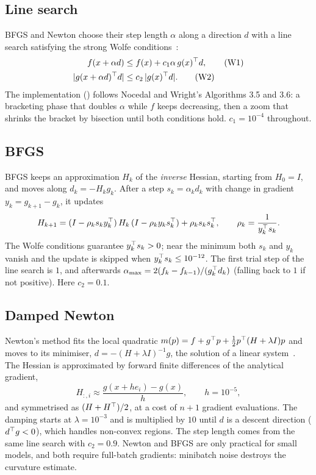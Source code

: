 \subsection{Line search}
BFGS and Newton choose their step length $\alpha$ along a direction $d$ with a line search
satisfying the strong Wolfe conditions~\cite{nocedal2006}:
\begin{align}
  f(x + \alpha d) &\le f(x) + c_1 \alpha\, g(x)^{\top} d, \tag{W1}\\
  |g(x + \alpha d)^{\top} d| &\le c_2\, |g(x)^{\top} d|. \tag{W2}
\end{align}
The implementation () follows Nocedal and Wright's Algorithms 3.5 and 3.6: a
bracketing phase that doubles $\alpha$ while $f$ keeps decreasing, then a zoom that shrinks the
bracket by bisection until both conditions hold. $c_1 = 10^{-4}$ throughout.

\subsection{BFGS}
BFGS keeps an approximation $H_k$ of the \emph{inverse} Hessian, starting from $H_0 = I$, and moves
along $d_k = -H_k g_k$. After a step $s_k = \alpha_k d_k$ with change in gradient
$y_k = g_{k+1} - g_k$, it updates
\begin{equation}
  H_{k+1} = (I - \rho_k s_k y_k^{\top})\, H_k\, (I - \rho_k y_k s_k^{\top}) + \rho_k s_k s_k^{\top},
  \qquad \rho_k = \frac{1}{y_k^{\top} s_k}.
\end{equation}
The Wolfe conditions guarantee $y_k^{\top} s_k > 0$; near the minimum both $s_k$ and $y_k$ vanish and the
update is skipped when $y_k^{\top} s_k \le 10^{-12}$. The first trial step of the line search is $1$, and
afterwards $\alpha_{\max} = 2(f_k - f_{k-1})/(g_k^{\top} d_k)$ (falling back to $1$ if not positive).
Here $c_2 = 0.1$.

\subsection{Damped Newton}
Newton's method fits the local quadratic $m(p) = f + g^{\top} p + \tfrac12 p^{\top} (H + \lambda I) p$ and
moves to its minimiser, $d = -(H + \lambda I)^{-1} g$, the solution of a linear system~\cite{upc-alg}. The Hessian is approximated by forward finite
differences of the analytical gradient,
\begin{equation}
  H_{:,i} \approx \frac{g(x + h e_i) - g(x)}{h}, \qquad h = 10^{-5},
\end{equation}
and symmetrised as $(H + H^{\top})/2$, at a cost of $n+1$ gradient evaluations. The damping starts at
$\lambda = 10^{-3}$ and is multiplied by $10$ until $d$ is a descent direction ($d^{\top} g < 0$), which
handles non-convex regions. The step length comes from the same line search with $c_2 = 0.9$.
Newton and BFGS are only practical for small models, and both require full-batch
gradients: minibatch noise destroys the curvature estimate.
